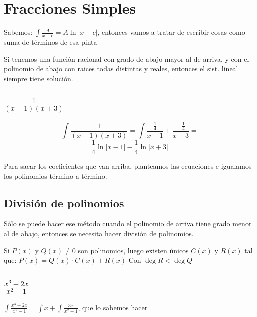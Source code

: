 \documentclass{article}
\begin{document}
\section{Fracciones Simples}
Sabemos:
\(
\int \frac{A}{x - c} = A \ln |x - c|
\), entonces vamos a tratar de escribir cosas como suma de términos de esa
pinta

Si tenemos una función racional con grado de abajo mayor al de arriva, y con
el polinomio de abajo con raices todas distintas y reales, entonces el sist.
lineal siempre tiene solución.

\subsection{$\frac{1}{(x-1)(x+3)}$}
\[
\int \frac{1}{(x-1)(x+3)} = \int \frac{\frac{1}{4}}{x-1} +
\frac{-\frac{1}{4}}{x+3} = 
\]
\[
\frac{1}{4} \ln |x-1| - \frac{1}{4} \ln |x+3|
\]

Para sacar los coeficientes que van arriba, planteamos las ecuaciones e igualamos los polinomios término a término.

\subsection{División de polinomios}
Sólo se puede hacer ese método cuando el polinomio de arriva tiene grado
menor al de abajo, entonces se necesita hacer división de polinomios.

Si $P(x)$ y $Q(x) \neq 0$ son polinomios, luego existen únicos $C(x)$ y
$R(x)$ tal que: \(
P(x) = Q(x) \cdot C(x) + R(x)
\) Con \(
	\deg R < \deg Q
\)

\subsection{$\frac{x^3+2x}{x^2 - 1}$}
\(
\int \frac{x^3 + 2x}{x^2 - 1} = \int x + \int \frac{3x}{x^2-1}
\), que lo sabemos hacer
\end{document}
